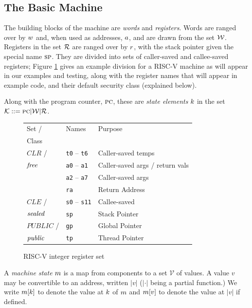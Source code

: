 \documentclass[10pt,conference]{ieeetran}%
\theoremstyle{definition}
\begin{document}
\subsection{The Basic Machine}

The building blocks of the machine are {\em words} and {\em registers}.
Words are ranged over by \(w\) and, when used as addresses, \(a\),
and are drawn from the set \({\mathcal W}\).
Registers in the set \({\mathcal R}\) are ranged over by \(r\), with the stack pointer
given the special name \(\textsc{sp}\).
They are divided into sets of caller-saved and callee-saved registers;
Figure \ref{fig:RISCVregs} gives an example division for a RISC-V machine as will
appear in our examples and testing, along with the register names that will appear in
example code, and their default security class (explained below).

Along with the program counter, \(\textsc{pc}\), these are {\em state elements} \(k\)
in the set \({\mathcal K} ::= \textsc{pc} | {\mathcal W} | {\mathcal R}\).

\begin{figure}
  \begin{tabular}{| l | l | l |}
    \hline
    Set / & Names & Purpose \\
    Class & & \\
    \hline
    \(\mathit{CLR}\) / & {\tt t0} -- {\tt t6} & Caller-saved temps \\
    \(\mathit{free}\) & {\tt a0} -- {\tt a1} & Caller-saved args / return vals \\
    & {\tt a2} -- {\tt a7} & Caller-saved args \\
    & {\tt ra} & Return Address \\
    \hline
    \(\mathit{CLE}\) / & {\tt s0} -- {\tt s11} & Callee-saved \\
    \(\mathit{sealed}\) & {\tt sp} & Stack Pointer \\  
    \hline
    \(\mathit{PUBLIC}\) / & {\tt gp} & Global Pointer  \\
    \(\mathit{public}\) & {\tt tp} & Thread Pointer \\
    \hline
  \end{tabular}
  \caption{RISC-V integer register set}
  \label{fig:RISCVregs}
\end{figure}

A {\em machine state} \(m\) is a map from components to a set \(\mathcal{V}\) of
values. A value \(v\) may be convertible to an address, written \(|v|\) (\(|\cdot|\)
being a partial function.) We write \(m[k]\) to denote the value at
\(k\) of \(m\) and \(m[v]\) to denote the value at \(|v|\) if
defined.
\end{document}
